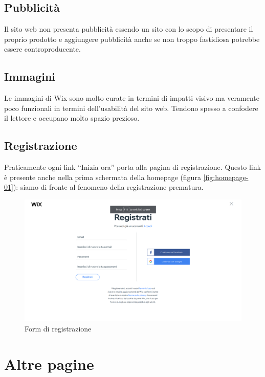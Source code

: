 \documentclass[11pt,a4paper]{article}
\newcommand*{\wix}{Wix}
\begin{document}
\subsection{Pubblicità}
\label{subsec:ads}

Il sito web non presenta pubblicità essendo un sito con lo scopo di
presentare il proprio prodotto e aggiungere pubblicità anche se non
troppo fastidiosa potrebbe essere controproducente.

\subsection{Immagini}
\label{subsec:images}

Le immagini di \wix{} sono molto curate in termini di impatti visivo
ma veramente poco funzionali in termini dell'usabilità del sito
web. Tendono spesso a confodere il lettore e occupano molto spazio
prezioso.

\subsection{Registrazione}
\label{subsec:signup}

Praticamente ogni link ``Inizia ora'' porta alla pagina di
registrazione. Questo link è presente anche nella prima schermata
della homepage (figura \ref{fig:homepage-01}): siamo di fronte al
fenomeno della registrazione prematura.

\begin{figure}[H]
  \centering
  \includegraphics[width=1\textwidth]{img/registration.png}
  \caption{Form di registrazione}
  \label{fig:registration}
\end{figure}

\section{Altre pagine}
\label{sec:other-pages}
\end{document}
